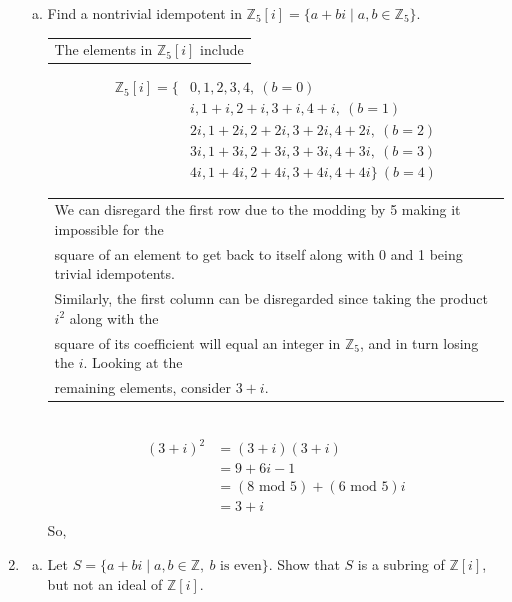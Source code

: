 \documentclass[12pt, letterpaper]{article}
\newcommand{\Z}{\mathbb{Z}}
\begin{document}
\begin{enumerate}
\begin{enumerate}[(a)]
        \item Find a nontrivial idempotent in $\Z_5[i] = \{a + bi \mid a, b \in \Z_5\}$.

        \begin{tabular}[t]{l}
            The elements in $\mathbb{Z}_5[i]$ include 
            \end{tabular} 
            \begin{align*}
                \mathbb{Z}_5[i] = \{&0, 1, 2, 3, 4, \ (b = 0)\\ 
                &i, 1 + i, 2 + i, 3 + i, 4 + i, \ (b = 1)\\
                &2i, 1 + 2i, 2 + 2i, 3 + 2i, 4 + 2i, \ (b = 2)\\
                &3i, 1 + 3i, 2 + 3i, 3 + 3i, 4 + 3i, \ (b = 3)\\
                &4i, 1 + 4i, 2 + 4i, 3 + 4i, 4 + 4i 
                \} \ (b = 4)
                \end{align*}
            \begin{tabular}[t]{l}
                We can disregard the first row due to the modding by 5 making it impossible for the \\
                square of an element to get back to itself along with 0 and 1 being trivial idempotents. \\ 
                Similarly, the first column can be disregarded since taking the product $i^2$ along with the \\
                square of its coefficient will equal an integer in $\mathbb{Z}_5$, and in turn losing the $i$. 
                Looking at the \\
                remaining elements, consider $3 + i$. 
                \end{tabular} \\ 
                \begin{align*}
                    (3 + i)^{2} &= (3 + i)(3 + i) \\
                    &= 9 + 6i - 1 \\
                    &= (8 \text{ mod } 5) + (6 \text{ mod } 5)i \\
                    &= 3 + i \\
                    \end{align*}
                    So, 
    \end{enumerate}

    \item %
    \begin{enumerate}[(a)]
        \item Let $S = \{a + bi \mid a, b \in \Z,\ b \text{ is even}\}$. Show that $S$ is a subring of $\Z[i]$, but not an ideal of $\Z[i]$.


\end{enumerate}
\end{enumerate}
\end{document}
